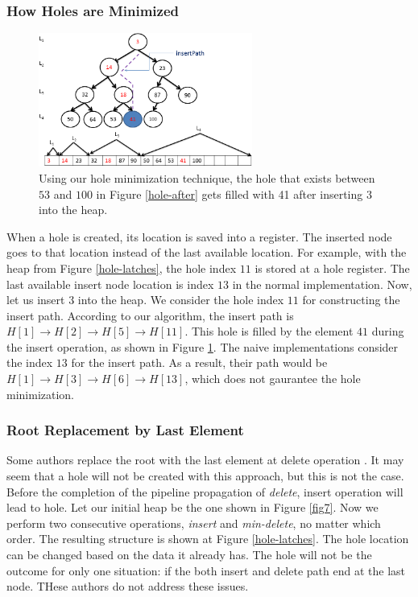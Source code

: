 \subsubsection{How Holes are Minimized} 
\begin{figure}[!ht]
  \centering
  \includegraphics[width=7cm]{fig/fillhole.png}
      \caption{Using our hole minimization technique, the hole that exists between $53$ and $100$ in Figure \ref{hole-after} gets filled with 41 after inserting $3$ into the heap.}
    \label{fillhole}
\end{figure}
When a hole is created, its location is saved into a register. 
The inserted node goes to that location instead of the last available location. 
For example, with the heap from Figure \ref{hole-latches}, the hole index $11$ is stored at a hole register. 
The last available insert node location is index $13$ in the normal implementation. 
Now, let us insert $3$ into the heap. 
We consider the hole index $11$ for constructing the insert path. 
According to our algorithm, the insert path is $H[1] \rightarrow H[2] \rightarrow H[5] \rightarrow H[11]$. 
This hole is filled by the element $41$ during the insert operation, as shown in Figure \ref{fillhole}. 
The naive implementations consider the index $13$ for the insert path.
As a result, their path would be $H[1] \rightarrow H[3] \rightarrow H[6] \rightarrow H[13]$, which does not gaurantee the hole minimization.

\subsubsection{Root Replacement by Last Element}
Some authors replace the root with the last element at delete operation \cite{hw2,hw3}. 
It may seem that a hole will not be created with this approach, but this is not the case. 
Before the completion of the pipeline propagation of {\it delete}, insert operation will lead to hole. 
Let our initial heap be the one shown in Figure \ref{fig7}. 
Now we perform two consecutive operations, {\it insert} and {\it min-delete}, no matter which order. 
The resulting structure is shown at Figure \ref{hole-latches}. 
The hole location can be changed based on the data it already has. 
The hole will not be the outcome for only one situation: if the both insert and delete path end at the last node. 
THese authors do not address these issues.

